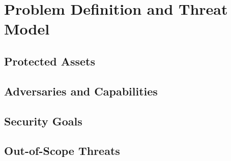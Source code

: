 %
%
%
%

\chapter{Problem Definition and Threat Model}

\section{Protected Assets}

\section{Adversaries and Capabilities}

\section{Security Goals}

\section{Out-of-Scope Threats}
